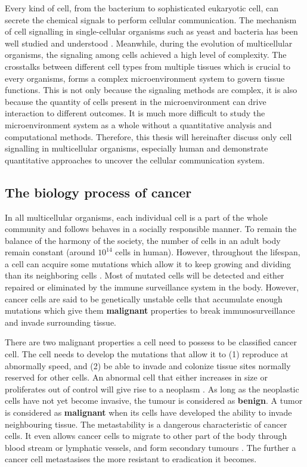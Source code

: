 Every kind of cell, from the bacterium to sophisticated eukaryotic cell, can secrete the chemical signals to perform cellular communication. The mechanism of cell signalling in single-cellular organisms such as yeast and bacteria has been well studied and understood \cite{alberts2018molecular}. Meanwhile, during the evolution of multicellular organisms, the signaling among cells achieved a high level of complexity. The crosstalks between different cell types from multiple tissues which is crucial to every organisms, forms a complex microenvironment system to govern tissue functions.  This is not only because the signaling methods are complex, it is also because the quantity of cells present in the microenvironment can drive interaction to different outcomes. It is much more difficult to study the microenvironment system as a whole without a quantitative analysis and computational methods. Therefore, this thesis will hereinafter discuss only cell signalling in multicellular organisms, especially human and demonstrate quantitative approaches to uncover the cellular communication system. 

\subsection{The biology process of cancer}
In all multicellular organisms, each individual cell is a part of the whole community and follows behaves in a socially responsible manner. To remain the balance of the harmony of the society, the number of cells in an adult body remain constant (around $10^{14}$ cells in human). However, throughout the lifespan, a cell can acquire some mutations which allow it to keep growing and dividing than its neighboring cells \cite{alberts2018molecular}. Most of mutated cells will be detected and either repaired or eliminated by the immune surveillance system in the body. However, cancer cells are said to be genetically unstable cells that accumulate enough mutations which give them \textbf{malignant} properties to break immunosurveillance and invade surrounding tissue. 

There are two malignant properties a cell need to possess to be classified cancer cell. The cell needs to develop the mutations that allow it to (1) reproduce at abnormally speed, and (2) be able to invade and colonize tissue sites normally reserved for other cells. An abnormal cell that either increases in size or proliferates out of control will give rise to a neoplasm \cite{alberts2018molecular, hanahan2000hallmarks}. As long as the neoplastic cells have not yet become invasive, the tumour is considered as \textbf{benign}. A tumor is considered as \textbf{malignant} when its cells have developed the ability to invade neighbouring tissue. The metastability is a dangerous characteristic of cancer cells. It even allows cancer cells to migrate to other part of the body through blood stream or lymphatic vessels, and form secondary tumours \cite{alberts2018molecular}. The further a cancer cell metastasises the more resistant to eradication it becomes.     

